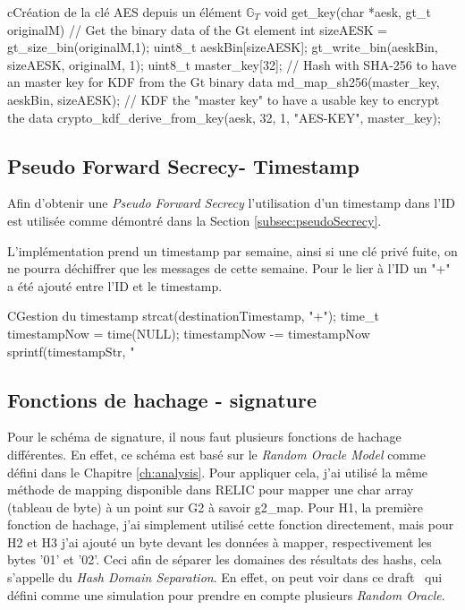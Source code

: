 \begin{sourcebox}{c}{Création de la clé AES depuis un élément $\mathbb{G}_T$}
	void get_key(char *aesk, gt_t originalM) {
		// Get the binary data of the Gt element
		int sizeAESK = gt_size_bin(originalM,1);
		uint8_t aeskBin[sizeAESK];
		gt_write_bin(aeskBin, sizeAESK, originalM, 1);
		uint8_t master_key[32];
		// Hash with SHA-256 to have an master key for KDF from the Gt binary data
		md_map_sh256(master_key, aeskBin, sizeAESK);
		// KDF the "master key" to have a usable key to encrypt the data
		crypto_kdf_derive_from_key(aesk, 32, 1, "AES-KEY", master_key);
	}
\end{sourcebox}

\subsection{Pseudo Forward Secrecy- Timestamp}
Afin d'obtenir une \textit{Pseudo Forward Secrecy} l'utilisation d'un timestamp dans l'ID est utilisée comme démontré dans la Section \ref{subsec:pseudoSecrecy}.

L'implémentation prend un timestamp par semaine, ainsi si une clé privé fuite, on ne pourra déchiffrer que les messages de cette semaine. Pour le lier à l'ID un "+" a été ajouté entre l'ID et le timestamp.
\begin{sourcebox}{C}{Gestion du timestamp}
	strcat(destinationTimestamp, "+");
	time_t timestampNow = time(NULL);
	timestampNow -= timestampNow %
	sprintf(timestampStr, "%
\end{sourcebox}

\subsection{Fonctions de hachage - signature}
Pour le schéma de signature, il nous faut plusieurs fonctions de hachage différentes. En effet, ce schéma est basé sur le \textit{Random Oracle Model} comme défini dans le Chapitre \ref{ch:analysis}. Pour appliquer cela, j'ai utilisé la même méthode de mapping disponible dans RELIC pour mapper une char array (tableau de byte) à un point sur G2 à savoir g2\_map.
Pour H1, la première fonction de hachage, j'ai simplement utilisé cette fonction directement, mais pour H2 et H3 j'ai ajouté un byte devant les données à mapper, respectivement les bytes '01' et '02'. Ceci afin de séparer les domaines des résultats des hashs, cela s'appelle du \textit{Hash Domain Separation}. En effet, on peut voir dans ce draft~\cite{irtf-cfrg-hash-to-curve} qui défini comme une simulation pour prendre en compte plusieurs \textit{Random Oracle}.

